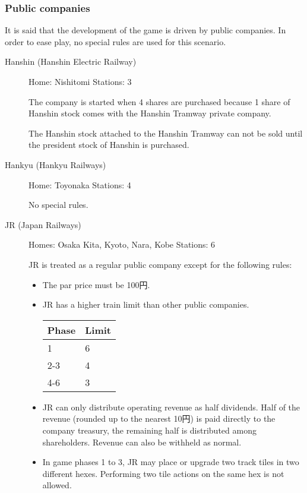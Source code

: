\documentclass{article}
\begin{document}
\begin{CJK}{UTF8}{min}
\begin{multicols}{2}
\begin{description}
\end{description}

\subsubsection{Public companies}
It is said that the development of the game is driven by public
companies. In order to ease play, no special rules are used for this
scenario.
\begin{description}
\item[Hanshin (Hanshin Electric Railway)] \hfill

  Home: Nishitomi \hfill Stations: 3

  The company is started when 4 shares are purchased because 1 share
  of Hanshin stock comes with the Hanshin Tramway private company.

  The Hanshin stock attached to the Hanshin Tramway can not be sold
  until the president stock of Hanshin is purchased.

\item[Hankyu (Hankyu Railways)] \hfill
Home: Toyonaka \hfill Stations: 4

  No special rules.

\item[JR (Japan Railways)] \hfill \label{JR}
Homes: Osaka Kita, Kyoto, Nara, Kobe \hfill Stations: 6

JR is treated as a regular public company except for the following rules:
\begin{itemize}
\item The par price must be 100円.
\item JR has a higher train limit than other public companies.

\begin{tabular}{ll}
  Phase & Limit \\
  \hline
  1 &  6 \\
  2-3 & 4 \\
  4-6 & 3
\end{tabular}
\item JR can only distribute operating revenue as half dividends. Half
  of the revenue (rounded up to the nearest 10円) is paid directly
  to the company treasury, the remaining half is distributed among
  shareholders. Revenue can also be withheld as normal.
\item In game phases 1 to 3, JR may place or upgrade two track tiles in
  two different hexes. Performing two tile actions on the same hex is
  not allowed.
\end{itemize}


\end{description}
\end{multicols}
\end{CJK}
\end{document}
